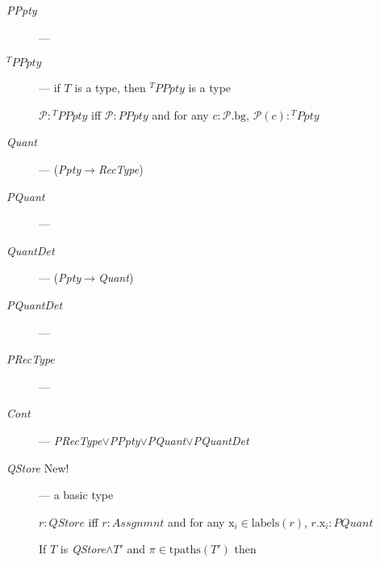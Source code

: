 \begin{description}
      \item[\textnormal{\textit{PPpty}}] --- 

        
      \item[\textnormal{$^T\textit{PPpty}$}] --- if $T$ is a
        type, then $^T\textit{PPpty}$ is a type

        $\mathcal{P}:{^T\textit{PPpty}}$ iff
  $\mathcal{P}:\textit{PPpty}$ and for any $c:\mathcal{P}.\text{bg}$, $\mathcal{P}(c):{^T\textit{Ppty}}$
        
      \item[\textnormal{\textit{Quant}}] ---
        (\textit{Ppty}$\rightarrow$\textit{RecType})
        
      \item[\textnormal{\textit{PQuant}}] --- 
        
      \item[\textnormal{\textit{QuantDet}}] ---
        (\textit{Ppty}$\rightarrow$\textit{Quant})
        
      \item[\textnormal{\textit{PQuantDet}}] ---
        
      \item[\textnormal{\textit{PRecType}}] ---
          

    \item[\textnormal{\textit{Cont}}] ---
      \textit{PRecType}$\vee$\textit{PPpty}$\vee$\textit{PQuant}$\vee$\textit{PQuantDet}

      
    \item[\textnormal{\textit{QStore}} New!] --- a basic type

      $r:\textit{QStore}$ iff $r:Assgnmnt$
and for any $\text{x}_i\in\mathrm{labels}(r)$,
$r.\text{x}_i:\textit{PQuant}$

If $T$ is \textit{QStore}$\wedge T'$ and
  $\pi\in\mathrm{tpaths}(T')$ then
  \begin{enumerate}
    

\end{enumerate}
\end{description}
